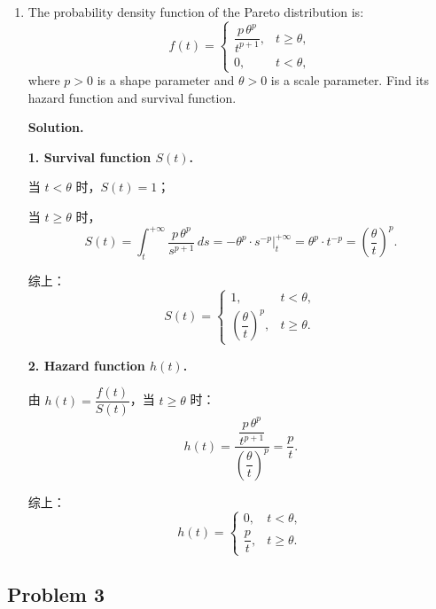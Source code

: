 \begin{enumerate}
\item The probability density function of the Pareto distribution is:
\[
f(t) = \begin{cases} \dfrac{p\,\theta^p}{t^{p+1}}, & t \ge \theta, \\[6pt] 0, & t < \theta, \end{cases}
\]
where $p > 0$ is a shape parameter and $\theta > 0$ is a scale parameter. Find its hazard function and survival function.

\textbf{Solution.}

\textbf{1. Survival function $S(t)$.}

当 $t < \theta$ 时，$S(t) = 1$；

当 $t \ge \theta$ 时，
\[
S(t) = \int_t^{+\infty} \frac{p\,\theta^p}{s^{p+1}}\,ds
= -\theta^p \cdot s^{-p}\Big|_t^{+\infty}
= \theta^p \cdot t^{-p} = \left(\frac{\theta}{t}\right)^p.
\]

综上：
\[
\boxed{S(t) = \begin{cases} 1, & t < \theta, \\[4pt] \left(\dfrac{\theta}{t}\right)^p, & t \ge \theta. \end{cases}}
\]

\textbf{2. Hazard function $h(t)$.}

由 $h(t) = \dfrac{f(t)}{S(t)}$，当 $t \ge \theta$ 时：
\[
h(t) = \frac{\dfrac{p\,\theta^p}{t^{p+1}}}{\left(\dfrac{\theta}{t}\right)^p} = \frac{p}{t}.
\]

综上：
\[
\boxed{h(t) = \begin{cases} 0, & t < \theta, \\[4pt] \dfrac{p}{t}, & t \ge \theta. \end{cases}}
\]
\end{enumerate}

\subsection{Problem 3}

